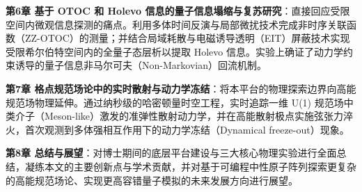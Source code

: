 \documentclass[../main.tex]{subfiles}
\begin{document}
\textbf{第6章 基于 OTOC 和 Holevo 信息的量子信息塌缩与复苏研究}：直接回应受限空间内微观信息探测的痛点。利用多体时间反演与局部微扰技术完成非时序关联函数（ZZ-OTOC）的测量；并结合局域耗散与电磁诱导透明（EIT）屏蔽技术实现受限希尔伯特空间内的全量子态层析以提取 Holevo 信息。实验上确证了动力学约束诱导的量子信息非马尔可夫（Non-Markovian）回流机制。

\textbf{第7章 格点规范场论中的实时散射与动力学冻结}：将本平台的物理探索边界向高能规范场物理延伸。通过纳秒级的哈密顿量时空工程，实时追踪一维 U(1) 规范场中类介子（Meson-like）激发的准弹性散射动力学，并在高能散射极点实施弦张力淬火，首次观测到多体强相互作用下的动力学冻结（Dynamical freeze-out）现象。

\textbf{第8章 总结与展望}：对博士期间的底层平台建设与三大核心物理实验进行全面总结，凝练本文的主要创新点与学术贡献，并对基于可编程中性原子阵列探索更复杂的高能规范场论、实现更高容错量子模拟的未来发展方向进行展望。








\end{document}
